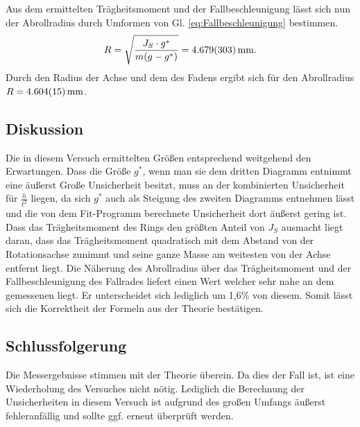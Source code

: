 			Aus dem ermittelten Trägheitsmoment und der Fallbeschleunigung lässt sich nun der Abrollradius durch Umformen von Gl. \ref{eq:Fallbeschleunigung} bestimmen.
			\begin{equation}
				R = \sqrt{\frac{J_S \cdot g^{*}}{m(g-g^{*})}} = \SI{4,679+-0,303}{\mm}.
			\end{equation}
			Durch den Radius der Achse und dem des Fadens ergibt sich für den Abrollradius $R = \SI{4,604+-0,015}{\mm}$.
			
	\subsection{Diskussion}
			
			Die in diesem Versuch ermittelten Größen entsprechend weitgehend den Erwartungen. Dass die Größe $g^{*}$, wenn man sie dem dritten Diagramm entnimmt eine äußerst Große Unsicherheit besitzt, muss an der kombinierten Unsicherheit für $\frac{h}{t^2}$ liegen, da sich $g^{*}$ auch als Steigung des zweiten Diagramms entnehmen lässt und die von dem Fit-Programm berechnete Unsicherheit dort äußerst gering ist. Dass das Trägheitsmoment des Rings den größten Anteil von $J_S$ ausmacht liegt daran, dass das Trägheitsmoment quadratisch mit dem Abstand von der Rotationsachse zunimmt und seine ganze Masse am weitesten von der Achse entfernt liegt.
			Die Näherung des Abrollradius über das Trägheitsmoment und der Fallbeschleunigung des Fallrades liefert einen Wert welcher sehr nahe an dem gemessenen liegt. Er unterscheidet sich lediglich um 1,6\% von diesem. Somit lässt sich die Korrektheit der Formeln aus der Theorie bestätigen.
			
	\subsection{Schlussfolgerung}
	
			Die Messergebnisse stimmen mit der Theorie überein. Da dies der Fall ist, ist eine Wiederholung des Versuches nicht nötig.
			Lediglich die Berechnung der Unsicherheiten in diesem Versuch ist aufgrund des großen Umfangs äußerst fehleranfällig und sollte ggf. erneut überprüft werden.